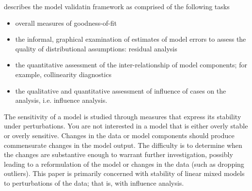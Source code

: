 \documentclass[12pt, a4paper]{article}
\begin{document}
			\citet{schab} describes the model validatin framework as comprised of the following tasks
			
			\begin{itemize}
				\item  overall measures of goodness-of-fit
				\item the informal, graphical examination of estimates of model errors to assess the quality of distributional
				assumptions: residual analysis
				
				
				\item the quantitative assessment of the inter-relationship of model components; for example, collinearity 	diagnostics
				\item the qualitative and quantitative assessment of influence of cases on the analysis, i.e. influence analysis.
			\end{itemize}
			
			The sensitivity of a model is studied through measures that express its stability under perturbations. You
			are not interested in a model that is either overly stable or overly sensitive. Changes in the data or model
			components should produce commensurate changes in the model output. The difficulty is to determine
			when the changes are substantive enough to warrant further investigation, possibly leading to a reformulation
			of the model or changes in the data (such as dropping outliers). This paper is primarily concerned
			with stability of linear mixed models to perturbations of the data; that is, with influence analysis. 
			
			
			
\end{document}
